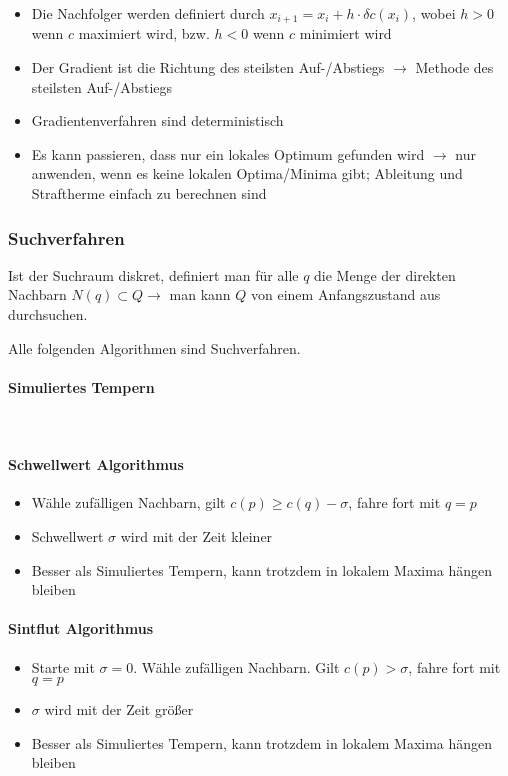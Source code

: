 \begin{itemize}
	\item Die Nachfolger werden definiert durch \(x_{i+1} = x_i + h \cdot \delta c(x_i)\), wobei \(h > 0\) wenn \(c\) maximiert wird, bzw. \(h < 0\) wenn \(c\) minimiert wird
	\item Der Gradient ist die Richtung des steilsten Auf-/Abstiegs $\rightarrow$ Methode des steilsten Auf-/Abstiegs
	\item Gradientenverfahren sind deterministisch
	\item Es kann passieren, dass nur ein lokales Optimum gefunden wird \(\rightarrow\) nur anwenden, wenn es keine lokalen Optima/Minima gibt; Ableitung und Straftherme einfach zu berechnen sind
\end{itemize}

\subsubsection{Suchverfahren}
Ist der Suchraum diskret, definiert man für alle \(q\) die Menge der direkten Nachbarn \(N(q) \subset Q \rightarrow\) man kann \(Q\) von einem Anfangszustand aus durchsuchen.

Alle folgenden Algorithmen sind Suchverfahren.

\paragraph{Simuliertes Tempern}
\text{}\\



\paragraph{Schwellwert Algorithmus}
\begin{itemize}
	\item Wähle zufälligen Nachbarn, gilt \(c(p) \geq c(q) - \sigma\), fahre fort mit \(q = p\)
	\item Schwellwert \(\sigma\) wird mit der Zeit kleiner
	\item Besser als Simuliertes Tempern, kann trotzdem in lokalem Maxima hängen bleiben
\end{itemize}

\paragraph{Sintflut Algorithmus}
\begin{itemize}
	\item Starte mit $\sigma = 0$. Wähle zufälligen Nachbarn. Gilt $c(p) > \sigma$, fahre fort mit $q = p$
	\item $\sigma$ wird mit der Zeit größer
	\item Besser als Simuliertes Tempern, kann trotzdem in lokalem Maxima hängen bleiben
\end{itemize}

